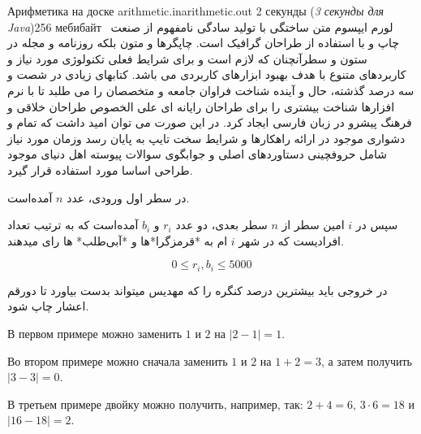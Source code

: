 \gdef\thisproblemauthor{Иван Казменко}
\gdef\thisproblemdeveloper{Иван Казменко}
\gdef\thisproblemorigin{\texttt{XXXIII} Чемпионат СПбГУ}
\begin{problem}{Арифметика на доске}
{arithmetic.in}{arithmetic.out}
{2 секунды (\textsl{3 секунды для Java})}{256 мебибайт}{}
\
لورم ایپسوم متن ساختگی با تولید سادگی نامفهوم از صنعت چاپ و با استفاده از طراحان گرافیک است. چاپگرها و متون بلکه روزنامه و مجله در ستون و سطرآنچنان که لازم است و برای شرایط فعلی تکنولوژی مورد نیاز و کاربردهای متنوع با هدف بهبود ابزارهای کاربردی می باشد. کتابهای زیادی در شصت و سه درصد گذشته، حال و آینده شناخت فراوان جامعه و متخصصان را می طلبد تا با نرم افزارها شناخت بیشتری را برای طراحان رایانه ای علی الخصوص طراحان خلاقی و فرهنگ پیشرو در زبان فارسی ایجاد کرد. در این صورت می توان امید داشت که تمام و دشواری موجود در ارائه راهکارها و شرایط سخت تایپ به پایان رسد وزمان مورد نیاز شامل حروفچینی دستاوردهای اصلی و جوابگوی سوالات پیوسته اهل دنیای موجود طراحی اساسا مورد استفاده قرار گیرد.
\InputFile

در سطر اول ورودی، عدد $n$ آمده‌است.

سپس در $i$ امین سطر از $n$ سطر بعدی، دو عدد $r_i$ و $b_i$ آمده‌است که به ترتیب تعداد افرادیست که در شهر $i$ ام به *قرمزگرا*ها و *آبی‌طلب* ها رای میدهند.

$$0 \le r_i, b_i \le 5000$$

\OutputFile

در خروجی باید بیشترین درصد کنگره را که مهدیس میتواند بدست بیاورد تا دورقم اعشار چاپ شود.


\Examples

\begin{example}
%
%
%
\end{example}

\Explanations

В первом примере можно заменить $1$ и $2$ на $|2 - 1| = 1$.

Во втором примере можно сначала заменить $1$ и $2$ на $1 + 2 = 3$,
а затем получить $|3 - 3| = 0$.

В третьем примере двойку можно получить, например, так:
$2 + 4 = 6$, $3 \cdot 6 = 18$ и $|16 - 18| = 2$.

\end{problem}
